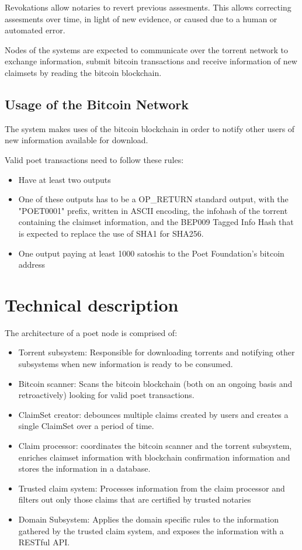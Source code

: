 \documentclass[12pt]{article}
\begin{document}
Revokations allow notaries to revert previous assesments. This allows correcting assesments over time, in light of new evidence, or caused due to a human or automated error.

Nodes of the systems are expected to communicate over the torrent network to exchange information, submit bitcoin transactions and receive information of new claimsets by reading the bitcoin blockchain.

\subsection{Usage of the Bitcoin Network}

The system makes uses of the bitcoin blockchain in order to notify other users of new information available for download.

Valid poet transactions need to follow these rules:
\begin{itemize}
    \item Have at least two outputs
    \item One of these outputs has to be a OP\_RETURN standard output, with
      the "POET0001" prefix, written in ASCII encoding,
      the infohash of the torrent containing the claimset information,
      and the BEP009 Tagged Info Hash that is expected to replace the use of SHA1 for SHA256.
    \item One output paying at least 1000 satoshis to the Poet Foundation's bitcoin address
\end{itemize}

\section{Technical description}

The architecture of a poet node is comprised of:

\begin{itemize}
    \item Torrent subsystem: Responsible for downloading torrents and notifying other subsystems when new information is ready to be consumed.
    \item Bitcoin scanner: Scans the bitcoin blockchain (both on an ongoing basis and retroactively) looking for valid poet transactions.
    \item ClaimSet creator: debounces multiple claims created by users and creates a single ClaimSet over a period of time.
    \item Claim processor: coordinates the bitcoin scanner and the torrent subsystem, enriches claimset information with blockchain confirmation information and stores the information in a database. 
    \item Trusted claim system: Processes information from the claim processor and filters out only those claims that are certified by trusted notaries
    \item Domain Subsystem: Applies the domain specific rules to the information gathered by the trusted claim system, and exposes the information with a RESTful API.
\end{itemize}
\end{document}
